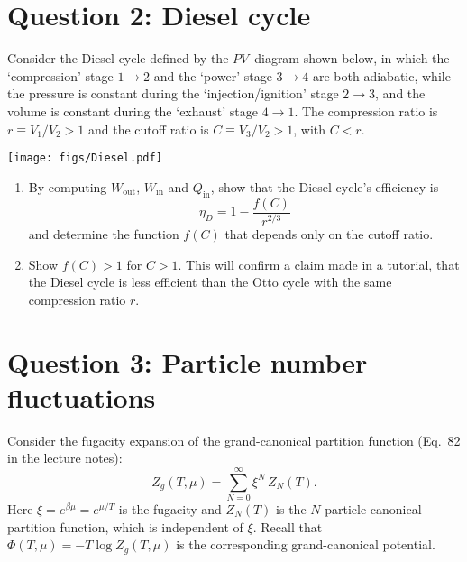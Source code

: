 \documentclass[12 pt]{article} %
\newcommand{\be}{\ensuremath{\beta} }
\newcommand{\showmarks}[1]{\rightline{\texttt{[#1 marks]}}} %
\begin{document}
\newpage
\section*{Question 2: Diesel cycle} %
Consider the Diesel cycle defined by the $PV$~diagram shown below, in which the `compression' stage $1 \to 2$ and the `power' stage $3 \to 4$ are both adiabatic, while the pressure is constant during the `injection/ignition' stage $2 \to 3$, and the volume is constant during the `exhaust' stage $4 \to 1$.
The compression ratio is $r \equiv V_1 / V_2 > 1$ and the cutoff ratio is $C \equiv V_3 / V_2 > 1$, with $C < r$.

\begin{center}\texttt{[image: figs/Diesel.pdf]}\end{center}

\begin{enumerate}[label={(\alph*)}]
  \item By computing $W_{\text{out}}$, $W_{\text{in}}$ and $Q_{\text{in}}$, show that the Diesel cycle's efficiency is
        \begin{equation*}
          \eta_D = 1 - \frac{f(C)}{r^{2 / 3}}
        \end{equation*}
        and determine the function $f(C)$ that depends only on the cutoff ratio.

  \showmarks{18}

  \item Show $f(C) > 1$ for $C > 1$.
        This will confirm a claim made in a tutorial, that the Diesel cycle is less efficient than the Otto cycle with the same compression ratio $r$.

  \showmarks{6}
\end{enumerate}



\vfill
\section*{Question 3: Particle number fluctuations}
Consider the fugacity expansion of the grand-canonical partition function (Eq.~82 in the lecture notes):
\begin{equation*}
  Z_g(T, \mu) = \sum_{N = 0}^{\infty} \xi^N \, Z_N(T).
\end{equation*}
Here $\xi = e^{\be \mu} = e^{\mu / T}$ is the fugacity and $Z_N(T)$ is the $N$-particle canonical partition function, which is independent of $\xi$.
Recall that $\Phi(T, \mu) = -T \log Z_g(T, \mu)$ is the corresponding grand-canonical potential.
\end{document}
